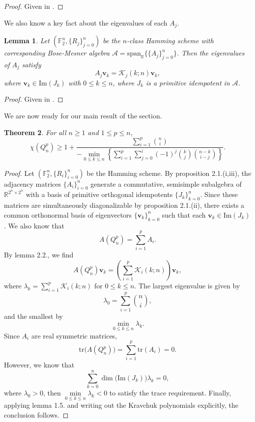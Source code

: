 \documentclass[12pt]{amsart}
\numberwithin{figure}{section}
\theoremstyle{plain}
\newtheorem{theorem}{Theorem}[section]
\newtheorem{lemma}[theorem]{Lemma}
\begin{document}
\begin{proof}
    Given in \cite{BI84}.
\end{proof}
\indent We also know a key fact about the eigenvalues of each $A_{j}$.
\begin{lemma}
    Let $(\mathbb{F}_{2}^{n}, \{R_{j}\}_{j=0}^{n})$ be the $n$-class Hamming scheme with corresponding Bose-Mesner algebra $\mathcal{A} =\mathrm{span}_{\mathbb{R}}\bigl\{\{A_{j}\}_{j=0}^{n}\bigr\}$. Then the eigenvalues of $A_{j}$ satisfy
    \[A_{j}\mathbf{v}_{k} = \mathcal{K}_{j}(k; n) \mathbf{v}_{k},\]
    where $\mathbf{v}_{k}\in\mathrm{Im}(J_{k})$ with $0\leq k\leq n$, where $J_{k}$ is a primitive idempotent in $\mathcal{A}$.
\end{lemma}
\begin{proof}
    Given in \cite{BI84}.
\end{proof}
\indent We are now ready for our main result of the section.
\begin{theorem}
For all $n\geq 1$ and $1\leq p \leq n$,
\[\chi(Q_{n}^{p}) \geq 1 + \dfrac{\sum_{i=1}^{p}\binom{n}{i}}{- \min\limits_{0\leq k\leq n}\left\{\sum_{i=1}^{p}\sum_{j=0}^{i}(-1)^{j}\binom{k}{j}\binom{n-k}{i-j}\right\}}.\]
\end{theorem}
\begin{proof}
    \indent Let $(\mathbb{F}_{2}^{n}, \{R_{i}\}_{i=0}^{n})$ be the Hamming scheme. By proposition 2.1.(i,iii), the adjacency matrices $\{A_{i}\}_{i=0}^{n}$ generate a commutative, semisimple subalgebra of $\mathbb{R}^{2^{n} \times 2^{n}}$ with a basis of primitive orthogonal idempotents $\{J_{k}\}_{k=0}^{n}$. Since these matrices are simultaneously diagonalizable by proposition 2.1.(ii), there exists a common orthonormal basis of eigenvectors $\{\mathbf{v}_{k}\}_{k=0}^{n}$ such that each $\mathbf{v}_{k} \in \mathrm{Im}(J_{k})$. We also know that 
    \[A(Q_{n}^{p}) = \sum_{i=1}^{p}A_{i}.\]
    By lemma 2.2., we find
    \[A(Q_{n}^{p})\mathbf{v}_{k} = \left(\sum_{i=1}^{p}\mathcal{K}_{i}(k; n)\right)\mathbf{v}_{k},\]
    where $\lambda_{k} = \sum_{i=1}^{p}\mathcal{K}_{i}(k; n)$ for $0\leq k\leq n$. The largest eigenvalue is given by
    \[\lambda_{0} = \sum_{i=1}^{p}\binom{n}{i},\]
    and the smallest by
    \[\min\limits_{0\leq k\leq n}\lambda_{k}.\]
    Since $A_{i}$ are real symmetric matrices, 
    \[\mathrm{tr}\bigl(A(Q_{n}^{p})\bigr) = \sum_{i=1}^{p}\mathrm{tr}(A_{i}) = 0.\]
    However, we know that
    \[\sum_{k=0}^{n}\dim\bigl(\mathrm{Im}(J_{k})\bigr)\lambda_{k} = 0,\]
    where $\lambda_{0} >0$, then $\min\limits_{0\leq k\leq n}\lambda_{k} < 0$ to satisfy the trace requirement. Finally, applying lemma 1.5. and writing out the Kravchuk polynomials explicitly, the conclusion follows.
\end{proof}
\end{document}
